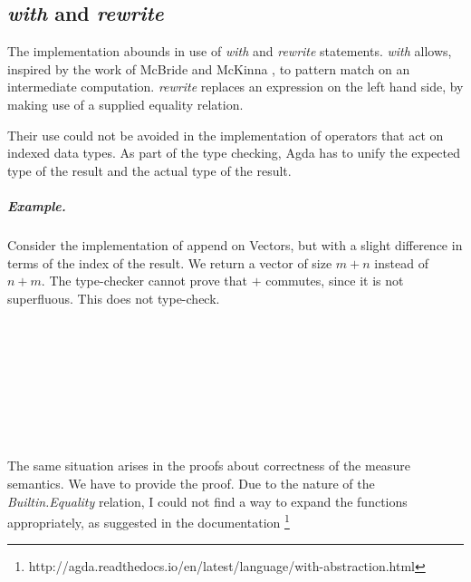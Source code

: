 \documentclass[12pt,twoside,notitlepage]{report}
\begin{document}
\subsection{\textit{with} and \textit{rewrite}}
\label{sec:with}
The implementation abounds in use of \textit{with} and \textit{rewrite} statements. \textit{with} allows, inspired by the work of McBride and McKinna \cite{viewfromtheleft}, to pattern match on an intermediate computation. \textit{rewrite} replaces an expression on the left hand side, by making use of a supplied equality relation.

Their use could not be avoided in the implementation of operators that act on indexed data types. As part of the type checking, Agda has to unify the expected type of the result and the actual type of the result. 

\subparagraph{Example.} Consider the implementation of append on Vectors, but with a slight difference in terms of the index of the result. We return a vector of size $m + n$ instead of $n + m$. The type-checker cannot prove that  $+$ commutes, since it is not superfluous. This does not type-check.

\begin{code}
\\
\> \AgdaSymbol{:}  \AgdaSymbol{\{}  \AgdaSymbol{\}}  \AgdaSymbol{\{} \AgdaSymbol{:}  \AgdaSymbol{\}}\<%
\\
\>[4]\<[6]%
\>[6]   \<%
\\
\>[4]\<[6]%
\>[6]   \<%
\\
\>[4]\<[6]%
\>[6]   \AgdaSymbol{(} \AgdaPrimitive{+} \AgdaSymbol{)}\<%
\\
\> \AgdaInductiveConstructor{[]}  \AgdaSymbol{=} \<%
\\
\> \AgdaSymbol{(}  \AgdaSymbol{)}  \AgdaSymbol{=}     \<%
\\
\end{code}

The same situation arises in the proofs about correctness of the measure semantics. We have to provide the proof. Due to the nature of the \textit{Builtin.Equality} relation, I could not find a way to expand the functions appropriately, as suggested in the documentation \footnote{http://agda.readthedocs.io/en/latest/language/with-abstraction.html}
\end{document}
